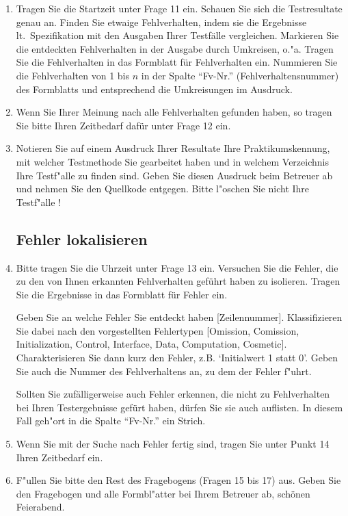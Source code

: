 \begin{enumerate}
\item Tragen Sie die Startzeit unter Frage 11 ein.
Schauen Sie sich die Testresultate genau an.
Finden Sie etwaige Fehlverhalten, indem sie die Ergebnisse
lt.~Spezifikation mit den Ausgaben Ihrer Testf\"alle vergleichen. 
Markieren Sie die entdeckten Fehlverhalten in der Ausgabe 
durch Umkreisen, o."a. Tragen Sie die Fehlverhalten in das Formblatt f\"ur
Fehlverhalten ein. Nummieren Sie die Fehlverhalten von 1 bis $n$ in der
Spalte "`Fv-Nr."' (Fehlverhaltensnummer) des Formblatts und entsprechend
die Umkreisungen im Ausdruck.

\item Wenn Sie Ihrer Meinung nach alle Fehlverhalten gefunden haben,
so tragen Sie bitte Ihren Zeitbedarf daf\"ur unter Frage 12 ein.


\item Notieren Sie auf einem Ausdruck Ihrer Resultate Ihre Praktikumskennung,
mit welcher Testmethode Sie gearbeitet haben und in welchem Verzeichnis
Ihre Testf"alle zu finden sind. Geben Sie diesen Ausdruck 
beim Betreuer ab und nehmen Sie den Quellkode entgegen. Bitte l"oschen Sie
nicht Ihre Testf"alle !

\subsection*{Fehler lokalisieren}

\item Bitte tragen Sie die Uhrzeit unter Frage 13 ein.
Versuchen Sie die Fehler, die zu den von Ihnen erkannten
Fehlverhalten gef\"uhrt haben zu isolieren. Tragen Sie die Ergebnisse
in das Formblatt f\"ur Fehler ein. 

Geben Sie an welche Fehler Sie entdeckt haben [Zeilennummer].
Klassifizieren Sie dabei nach den
vorgestellten Fehlertypen [{Omission, Comission}, {Initialization, Control,
Interface, Data, Computation, Cosmetic}]. Charakterisieren Sie dann 
kurz den Fehler, z.B. `Initialwert 1 statt 0'.  Geben Sie auch
die Nummer des Fehlverhaltens an, zu dem der Fehler f"uhrt.

Sollten Sie zuf\"alligerweise auch Fehler erkennen, die nicht zu
Fehlverhalten bei Ihren Testergebnisse gef\"urt haben, d\"urfen
Sie sie auch auflisten.  In diesem Fall geh"ort in die Spalte
"`Fv-Nr."' ein Strich.

\item Wenn Sie mit der Suche nach Fehler fertig sind, tragen Sie unter
Punkt 14 Ihren Zeitbedarf ein.

\item F"ullen Sie bitte den Rest des Fragebogens (Fragen 15 bis 17) aus.
Geben Sie den Fragebogen und alle Formbl"atter bei Ihrem Betreuer ab,
	sch\"onen Feierabend.

\end{enumerate}
